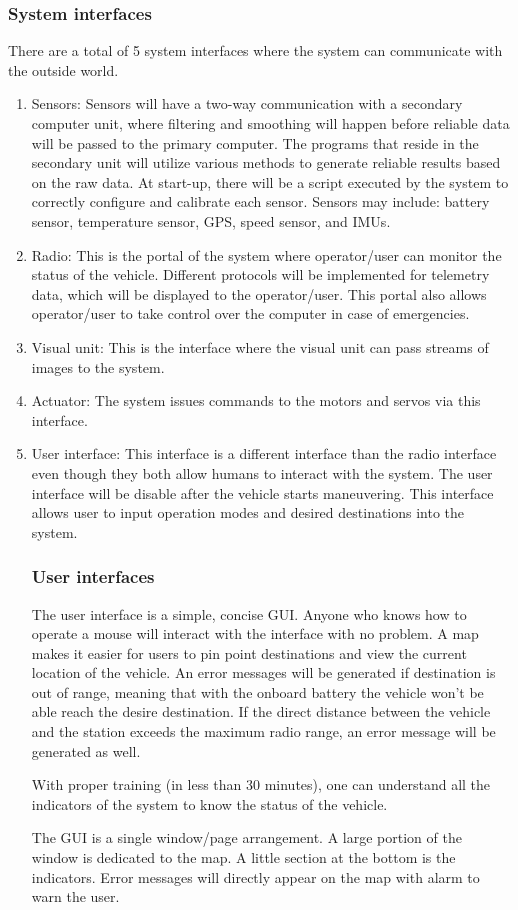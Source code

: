 \documentclass[draftclsnofoot,onecolumn,10pt]{IEEEtran}
\begin{document}
\subsubsection{System interfaces} %
There are a total of 5 system interfaces where the system can communicate with 
the outside world.
\begin{enumerate}
	\item Sensors: Sensors will have a two-way communication with a secondary 
computer unit, where filtering and smoothing will happen before reliable data will 
be passed to the primary computer. The programs that reside in the secondary unit 
will utilize various methods to generate reliable results based on the raw data. 
At start-up, there will be a script executed by the system to correctly configure 
and calibrate each sensor. Sensors may include: battery sensor, temperature sensor, 
GPS, speed sensor, and IMUs.
	\item Radio: This is the portal of the system where operator/user can monitor 
the status of the vehicle. Different protocols will be implemented for telemetry data, 
which will be displayed to the operator/user. This portal also allows operator/user to 
take control over the computer in case of emergencies. 
	\item Visual unit: This is the interface where the visual unit can pass streams 
of images to the system.
	\item Actuator: The system issues commands to the motors and servos via this 
interface. 
	\item User interface: This interface is a different interface than the radio 
interface even though they both allow humans to interact with the system. The user 
interface will be disable after the vehicle starts maneuvering. This interface allows 
user to input operation modes and desired destinations into the system.


\subsubsection{User interfaces} %
The user interface is a simple, concise GUI. Anyone who knows how to operate a mouse 
will interact with the interface with no problem. A map makes it easier for users to 
pin point destinations and view the current location of the vehicle. An error messages 
will be generated if destination is out of range, meaning that with the onboard battery 
the vehicle won’t be able reach the desire destination. If the direct distance between 
the vehicle and the station exceeds the maximum radio range, an error message will be 
generated as well.\par
With proper training (in less than 30 minutes), one can understand all the indicators 
of the system to know the status of the vehicle.\par
The GUI is a single window/page arrangement. A large portion of the window is dedicated 
to the map. A little section at the bottom is the indicators. Error messages will directly 
appear on the map with alarm to warn the user.\par



\end{enumerate}
\end{document}
